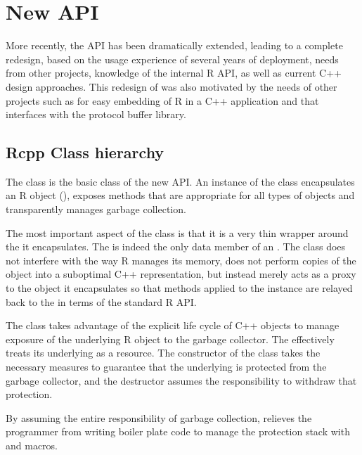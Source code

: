 \section{New  API}
\label{sec:new_rcpp}

More recently, the  API has been dramatically extended, leading to a 
complete redesign, based on the usage experience of several 
years of  deployment, needs from other projects, knowledge 
of the internal R API, as well as current C++ design approaches. 
This redesign of  was also motivated by the needs of other 
projects such as   \citep{cran:rinside} for easy embedding 
of R in a C++ application and  \citep{cran:rprotobuf} 
that interfaces with the protocol buffer library. 

\subsection{Rcpp Class hierarchy}

The  class is the basic class of the new  API. 
An instance of the  class encapsulates an R object
(), exposes methods that are appropriate for all types 
of objects and transparently manages garbage collection.

The most important aspect of the  class is that it is 
a very thin wrapper around the  it encapsulates. The 
 is indeed the only data member of an . The 
 class does not interfere with the way R manages its 
memory, does not perform copies of the object into a suboptimal 
C++ representation, but instead merely acts as a proxy to the 
object it encapsulates so that methods applied to the 
instance are relayed back to the  in terms of the standard
R API.

The  class takes advantage of the explicit life cycle of 
C++ objects to manage exposure of the underlying R object to the 
garbage collector. The  effectively treats 
its underlying  as a resource.
The constructor of the  class takes 
the necessary measures to guarantee that the underlying 
is protected from the garbage collector, and the destructor
assumes the responsibility to withdraw that protection. 

By assuming the entire responsibility of garbage collection, 
relieves the programmer from writing boiler plate code to manage
the protection stack with  and  macros.

